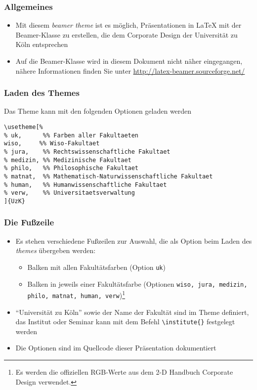 \documentclass[9pt]{beamer}
\begin{document}
\begin{frame}
  \frametitle{Allgemeines}

  \begin{itemize}
  \item Mit diesem \emph{beamer theme} ist es möglich, Präsentationen in
    \LaTeX{} mit der Beamer-Klasse zu erstellen, die dem Corporate Design der
    Universität zu Köln entsprechen
  \item Auf die Beamer-Klasse wird in diesem Dokument nicht näher eingegangen,
    nähere Informationen finden Sie unter
    \url{http://latex-beamer.sourceforge.net/}
  \end{itemize}

\end{frame}

\begin{frame}[fragile]
  \frametitle{Laden des Themes}
  \begin{block}{Das Theme kann mit den folgenden Optionen geladen werden}
    \begin{small}
\begin{verbatim}
\usetheme[%
% uk,      %% Farben aller Fakultaeten
wiso,     %% Wiso-Fakultaet
% jura,    %% Rechtswissenschaftliche Fakultaet
% medizin, %% Medizinische Fakultaet
% philo,   %% Philosophische Fakultaet
% matnat,  %% Mathematisch-Naturwissenschaftliche Fakultaet
% human,   %% Humanwissenschaftliche Fakultaet
% verw,    %% Universitaetsverwaltung
]{UzK}
\end{verbatim}
    \end{small}

  \end{block}
\end{frame}

\begin{frame}
  \frametitle{Die Fußzeile}

  \begin{itemize}
  \item Es stehen verschiedene Fußzeilen zur Auswahl, die als Option
    beim Laden des \emph{themes} übergeben werden:
    \begin{itemize}
    \item Balken mit allen Fakultätsfarben (Option \texttt{uk})
    \item Balken in jeweils einer Fakultätsfarbe (Optionen \texttt{wiso, jura,
        medizin, philo, matnat, human, verw})\footnote{Es werden die offiziellen
        RGB-Werte aus dem 2-D Handbuch Corporate Design verwendet.}
    \end{itemize}
  \item "`Universität zu Köln"' sowie der Name der Fakultät sind im
    Theme definiert, das Institut oder Seminar kann mit dem Befehl
    \texttt{\textbackslash institute\{\}} festgelegt werden
  \item Die Optionen sind im Quellcode dieser Präsentation dokumentiert
  \end{itemize}

\end{frame}
\end{document}
